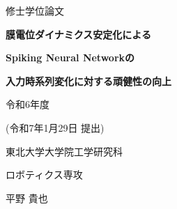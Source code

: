 \begin{titlepage}
    \begin{center}
        {\fontsize{24pt}{24pt}\selectfont  修士学位論文}
        \vspace{3cm}
  
        {\fontsize{20pt}{20pt}\selectfont \textbf{膜電位ダイナミクス安定化による}}
        \vspace{0.5cm}

        {\fontsize{20pt}{20pt}\selectfont \textbf{Spiking Neural Networkの}}
        \vspace{0.5cm}

        {\fontsize{20pt}{20pt}\selectfont \textbf{入力時系列変化に対する頑健性の向上}}
        \vspace{7cm}

        {\fontsize{18pt}{18pt}\selectfont 令和6年度} 
        \vspace{0.5cm}

        {\fontsize{18pt}{18pt}\selectfont (令和7年1月29日 提出)} 
        \vspace{3cm}

        {\fontsize{18pt}{18pt}\selectfont 東北大学大学院工学研究科}
        \vspace{0.5cm}

        {\fontsize{18pt}{18pt}\selectfont ロボティクス専攻}
        \vspace{1.0cm}

        {\fontsize{18pt}{18pt}\selectfont 平野 貴也}
    \end{center}
  \end{titlepage}
\cleardoublepage